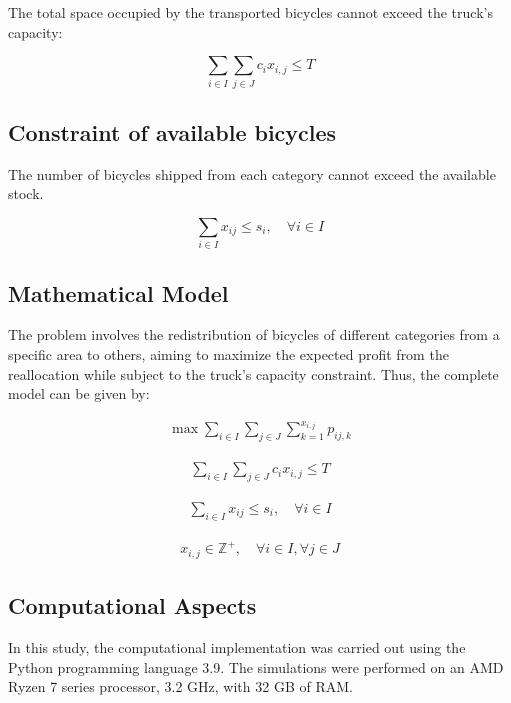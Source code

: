 \documentclass[]{article}
\begin{document}
The total space occupied by the transported bicycles cannot exceed the truck's capacity:

\begin{equation}
\sum_{i \in I} \sum_{j \in J} c_i x_{i,j} \leq T
\end{equation}

\subsection{Constraint of available bicycles}

The number of bicycles shipped from each category cannot exceed the available stock.

\begin{equation}
\sum_{i \in I} x_{ij} \leq s_i, \quad \forall i \in I
\end{equation}

\subsection{Mathematical Model}

The problem involves the redistribution of bicycles of different categories from a specific area to others, aiming to maximize the expected profit from the reallocation while subject to the truck's capacity constraint. Thus, the complete model can be given by:

	
\begin{align}
\max \sum_{i \in I} \sum_{j \in J} \sum_{k=1}^{x_{i,j}} p_{ij,k}
\end{align}

\begin{align}
\sum_{i \in I} \sum_{j \in J} c_i x_{i,j} \leq T
\end{align}

\begin{align}
\sum_{i \in I} x_{ij} \leq s_i, \quad \forall i \in I
\end{align}

\begin{align}
		x_{i,j} \in \mathbb{Z}^+,  \quad \forall i \in I, \forall j \in J
\end{align}
	




\subsection{Computational Aspects}

In this study, the computational implementation was carried out using the Python programming language 3.9. The simulations were performed on an AMD Ryzen 7 series processor, 3.2 GHz, with 32 GB of RAM.
\end{document}
